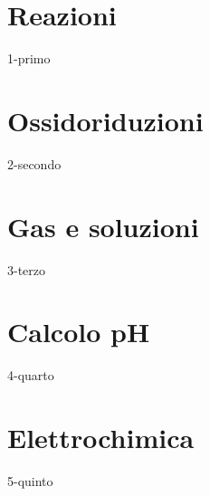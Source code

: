 \documentclass[openany,12pt]{book}%
\begin{document}
\section{Reazioni}
{1-primo}

\newpage

\section{Ossidoriduzioni}
{2-secondo}

\newpage

\section{Gas e soluzioni}
{3-terzo}

\newpage

\section{Calcolo pH}
{4-quarto}

\newpage

\section{Elettrochimica}
{5-quinto}
\end{document}
